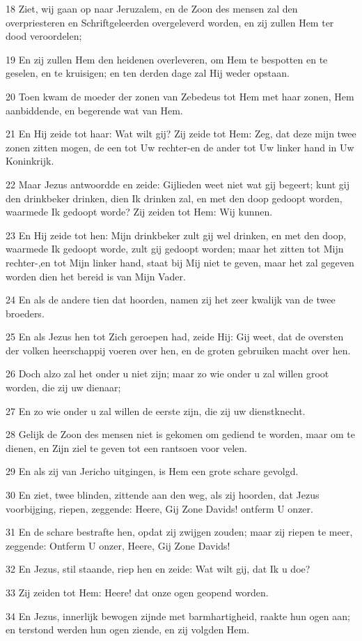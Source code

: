 \par 18 Ziet, wij gaan op naar Jeruzalem, en de Zoon des mensen zal den overpriesteren en Schriftgeleerden overgeleverd worden, en zij zullen Hem ter dood veroordelen;
\par 19 En zij zullen Hem den heidenen overleveren, om Hem te bespotten en te geselen, en te kruisigen; en ten derden dage zal Hij weder opstaan.
\par 20 Toen kwam de moeder der zonen van Zebedeus tot Hem met haar zonen, Hem aanbiddende, en begerende wat van Hem.
\par 21 En Hij zeide tot haar: Wat wilt gij? Zij zeide tot Hem: Zeg, dat deze mijn twee zonen zitten mogen, de een tot Uw rechter-en de ander tot Uw linker hand in Uw Koninkrijk.
\par 22 Maar Jezus antwoordde en zeide: Gijlieden weet niet wat gij begeert; kunt gij den drinkbeker drinken, dien Ik drinken zal, en met den doop gedoopt worden, waarmede Ik gedoopt worde? Zij zeiden tot Hem: Wij kunnen.
\par 23 En Hij zeide tot hen: Mijn drinkbeker zult gij wel drinken, en met den doop, waarmede Ik gedoopt worde, zult gij gedoopt worden; maar het zitten tot Mijn rechter-,en tot Mijn linker hand, staat bij Mij niet te geven, maar het zal gegeven worden dien het bereid is van Mijn Vader.
\par 24 En als de andere tien dat hoorden, namen zij het zeer kwalijk van de twee broeders.
\par 25 En als Jezus hen tot Zich geroepen had, zeide Hij: Gij weet, dat de oversten der volken heerschappij voeren over hen, en de groten gebruiken macht over hen.
\par 26 Doch alzo zal het onder u niet zijn; maar zo wie onder u zal willen groot worden, die zij uw dienaar;
\par 27 En zo wie onder u zal willen de eerste zijn, die zij uw dienstknecht.
\par 28 Gelijk de Zoon des mensen niet is gekomen om gediend te worden, maar om te dienen, en Zijn ziel te geven tot een rantsoen voor velen.
\par 29 En als zij van Jericho uitgingen, is Hem een grote schare gevolgd.
\par 30 En ziet, twee blinden, zittende aan den weg, als zij hoorden, dat Jezus voorbijging, riepen, zeggende: Heere, Gij Zone Davids! ontferm U onzer.
\par 31 En de schare bestrafte hen, opdat zij zwijgen zouden; maar zij riepen te meer, zeggende: Ontferm U onzer, Heere, Gij Zone Davids!
\par 32 En Jezus, stil staande, riep hen en zeide: Wat wilt gij, dat Ik u doe?
\par 33 Zij zeiden tot Hem: Heere! dat onze ogen geopend worden.
\par 34 En Jezus, innerlijk bewogen zijnde met barmhartigheid, raakte hun ogen aan; en terstond werden hun ogen ziende, en zij volgden Hem.

